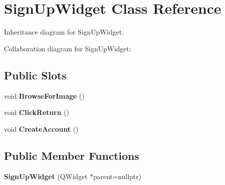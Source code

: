 \hypertarget{classSignUpWidget}{}\section{Sign\+Up\+Widget Class Reference}
\label{classSignUpWidget}


Inheritance diagram for Sign\+Up\+Widget\+:


Collaboration diagram for Sign\+Up\+Widget\+:
\subsection*{Public Slots}
\begin{DoxyCompactItemize}
\item 
\mbox{\label{classSignUpWidget_ae0de34039f7e05bb8901c84533e5a160}} 
void {\bfseries Browse\+For\+Image} ()
\item 
\mbox{\label{classSignUpWidget_ab4af9be338fd97119fe6e01234da8a80}} 
void {\bfseries Click\+Return} ()
\item 
\mbox{\label{classSignUpWidget_af5d2a451a5552737ccdb9c14b5a75ad5}} 
void {\bfseries Create\+Account} ()
\end{DoxyCompactItemize}
\subsection*{Public Member Functions}
\begin{DoxyCompactItemize}
\item 
\mbox{\label{classSignUpWidget_aa6ee3a3bcdfe86cc64a340ffdcc64088}} 
{\bfseries Sign\+Up\+Widget} (Q\+Widget $\ast$parent=nullptr)
\end{DoxyCompactItemize}
